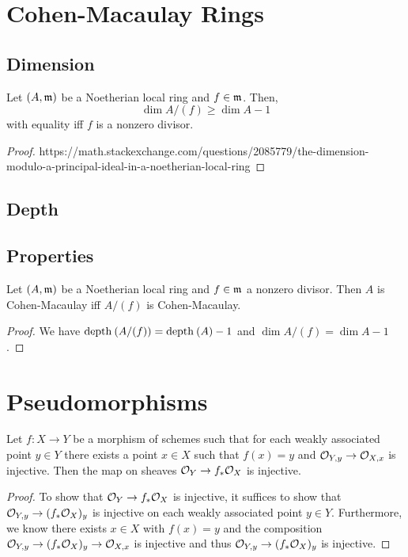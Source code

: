 \documentclass[12pt]{article}
\begin{document}
\section{Cohen-Macaulay Rings}

\subsection{Dimension}

\begin{prop}
Let $(A, \mathfrak{m})$ be a Noetherian local ring and $f \in \mathfrak{m}$. Then,
\[ \dim{A/(f)} \ge \dim{A} - 1 \]
with equality iff $f$ is a nonzero divisor.
\end{prop}

\begin{proof}
https://math.stackexchange.com/questions/2085779/the-dimension-modulo-a-principal-ideal-in-a-noetherian-local-ring
\end{proof}

\subsection{Depth}

\subsection{Properties}

\begin{prop}
Let $(A, \mathfrak{m})$ be a Noetherian local ring and $f \in \mathfrak{m}$ a nonzero divisor. Then $A$ is Cohen-Macaulay iff $A / (f)$ is Cohen-Macaulay.
\end{prop}

\begin{proof}
We have $\mathrm{depth}_{} \left( A/(f) \right) = \mathrm{depth}_{} \left( A \right) - 1$ and $\dim{A/(f)} = \dim{A} - 1$.
\end{proof}


\section{Pseudomorphisms}

\begin{lemma}
Let $f : X \to Y$ be a morphism of schemes such that for each weakly associated point $y \in Y$ there exists a point $x \in X$ such that $f(x) = y$ and $\mathcal{O}_{Y, y} \to \mathcal{O}_{X, x}$ is injective. Then the map on sheaves $\mathcal{O}_{Y} \to f_* \mathcal{O}_{X}$ is injective.
\end{lemma}

\begin{proof}
To show that $\mathcal{O}_{Y} \to f_* \mathcal{O}_{X}$ is injective, it suffices to show that $\mathcal{O}_{Y, y} \to (f_* \mathcal{O}_{X})_y$ is injective on each weakly associated point $y \in Y$. Furthermore, we know there exists $x \in X$ with $f(x) = y$ and the composition $\mathcal{O}_{Y, y} \to (f_* \mathcal{O}_{X})_y \to \mathcal{O}_{X, x}$ is injective and thus $\mathcal{O}_{Y, y} \to (f_* \mathcal{O}_{X})_y$ is injective.
\end{proof}
\end{document}
